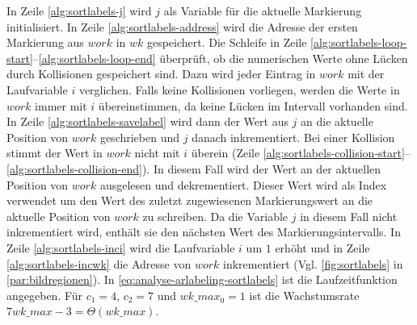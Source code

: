 In Zeile \ref{alg:sortlabels-j} wird $j$ als Variable für die aktuelle Markierung initialisiert. In Zeile
 \ref{alg:sortlabels-address} wird die Adresse der ersten Markierung aus $\mathit{work}$ in $\mathit{wk}$ gespeichert.
 Die Schleife in Zeile \ref{alg:sortlabels-loop-start}--\ref{alg:sortlabels-loop-end} überprüft, ob die numerischen
 Werte ohne Lücken durch Kollisionen gespeichert sind. Dazu wird jeder Eintrag in $\mathit{work}$ mit der Laufvariable
 $i$ verglichen. Falls keine Kollisionen vorliegen, werden die Werte in $\mathit{work}$ immer mit $i$ übereinstimmen,
 da keine Lücken im Intervall vorhanden sind. In Zeile \ref{alg:sortlabels-savelabel} wird dann der Wert aus $j$ an die
 aktuelle Position von $\mathit{work}$ geschrieben und $j$ danach inkrementiert. Bei einer Kollision stimmt der Wert in
 $\mathit{work}$ nicht mit $i$ überein
 (Zeile \ref{alg:sortlabels-collision-start}--\ref{alg:sortlabels-collision-end}). In diesem Fall wird der Wert an der
 aktuellen Position von $\mathit{work}$ ausgelesen und dekrementiert. Dieser Wert wird als Index verwendet um den Wert
 des zuletzt zugewiesenen Markierungswert an die aktuelle Position von $\mathit{work}$ zu schreiben. Da die Variable
 $j$ in diesem Fall nicht inkrementiert wird, enthält sie den nächsten Wert des Markierungsintervalls. In Zeile
 \ref{alg:sortlabels-inci} wird die Laufvariable $i$ um $1$ erhöht und in Zeile \ref{alg:sortlabels-incwk} die Adresse
 von $\mathit{work}$ inkrementiert (Vgl. \autoref{fig:sortlabels} in \autoref{par:bildregionen}). In
 \autoref{eq:analyse-arlabeling-sortlabels} ist die Laufzeitfunktion angegeben. Für $c_{1} = 4$, $c_{2} = 7$ und
 $\mathit{wk\_max}_{0} = 1$ ist die Wachstumsrate $7\mathit{wk\_max} - 3 = \Theta(\mathit{wk\_max})$.


